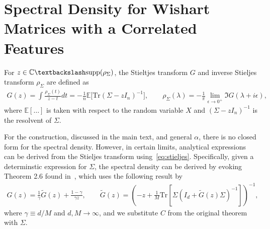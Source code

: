 \documentclass{article}
\DeclareMathOperator{\tr}{tr}
\def\tr{\textrm{Tr}}
\begin{document}
\section{Spectral Density for Wishart Matrices with a Correlated Features}
\label{sec:wishart_density}


For $z \in \mathbb{C} \textbackslash \text{supp}( \rho_\Sigma)$, the Stieltjes transform $G$ and inverse Stieljes transform $\rho_\Sigma$ are defined as
\begin{align}
\label{eq:stieljes}
    G(z)
     = 
     \int \frac{\rho_\Sigma(t)}{z-t}dt
    =
    -\frac{1}{n}\mathbb{E}
    \big[
     \tr (\Sigma- z I_n )^{-1}
    \big],
    \qquad 
        \rho_\Sigma(\lambda)
    =
    -\frac{1}{\pi}
    \lim_{\epsilon \to 0^+}
    \Im
    G(\lambda+ i \epsilon),    
\end{align}
where $\mathbb{E}[\ldots]$ is taken with respect to the random variable $X$ and $(\Sigma- z I_n )^{-1}$
is the resolvent of $\Sigma$. 

For the construction, discussed in the main text, and general $\alpha$, there is no closed form for the spectral density. However, in certain limits, analytical expressions can be derived from the Stieljes transform using~\cref{eq:stieljes}. 
Specifically, given a determinstic expression for $\Sigma$, the spectral density can be derived by evoking Theorem 2.6 found in~\citet{couillet_liao_2022}, which uses the following result by~\citet{silverstein1995empirical}
\begin{align}
\label{eq:stiel_cov}
    G(z) = \frac{1}{\gamma}\tilde{G}(z)
    +
    \frac{1-\gamma }{\gamma z}, 
    \qquad
    \tilde{G}(z)
    =
    \left(
    -z + \frac{1}{M}
    \tr \left[ \Sigma (I_d + \tilde{G}(z) \Sigma )^{-1} \right]
    \right)^{-1},
\end{align}
where $\gamma \equiv d/M$ and $d,M \to \infty$, and we substitute $C$ from the original theorem with $\Sigma$.
\end{document}
